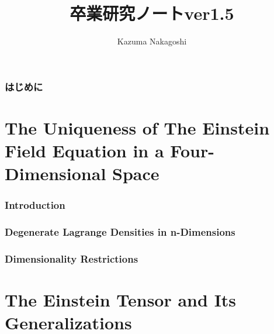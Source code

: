 \documentclass[a4j, 12pt]{jsarticle}
\title{卒業研究ノートver1.5}
\author{Kazuma Nakagoshi}
\begin{document}
\maketitle
\begin{abstract}
    
\end{abstract}

\tableofcontents
\clearpage

\section*{はじめに}


\part{The Uniqueness of The Einstein Field Equation in a Four-Dimensional Space}

\section{Introduction}


\section{Degenerate Lagrange Densities in n-Dimensions}


\section{Dimensionality Restrictions}

\clearpage
\part{The Einstein Tensor and Its Generalizations}



\end{document}
